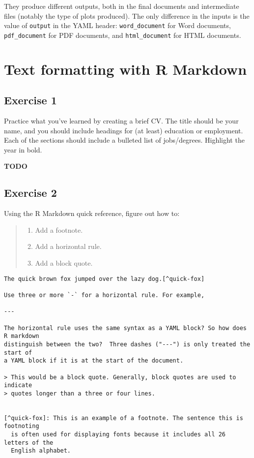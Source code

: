 \documentclass[]{book}
\providecommand{\tightlist}{%
  \setlength{\itemsep}{0pt}\setlength{\parskip}{0pt}}
\theoremstyle{definition}
\theoremstyle{definition}
\theoremstyle{definition}
\theoremstyle{remark}
\begin{document}
They produce different outputs, both in the final documents and
intermediate files (notably the type of plots produced). The only
difference in the inputs is the value of \texttt{output} in the YAML
header: \texttt{word\_document} for Word documents,
\texttt{pdf\_document} for PDF documents, and \texttt{html\_document}
for HTML documents.

\hypertarget{text-formatting-with-r-markdown}{%
\section{Text formatting with R
Markdown}\label{text-formatting-with-r-markdown}}

\hypertarget{exercise-1-66}{%
\subsection{Exercise 1}\label{exercise-1-66}}

Practice what you've learned by creating a brief CV. The title should be
your name, and you should include headings for (at least) education or
employment. Each of the sections should include a bulleted list of
jobs/degrees. Highlight the year in bold.

\textbf{TODO}

\hypertarget{exercise-2-65}{%
\subsection{Exercise 2}\label{exercise-2-65}}

Using the R Markdown quick reference, figure out how to:

\begin{quote}
\begin{enumerate}
\def\labelenumi{\arabic{enumi}.}
\tightlist
\item
  Add a footnote.
\item
  Add a horizontal rule.
\item
  Add a block quote.
\end{enumerate}
\end{quote}

\begin{verbatim}
The quick brown fox jumped over the lazy dog.[^quick-fox]

Use three or more `-` for a horizontal rule. For example,

---

The horizontal rule uses the same syntax as a YAML block? So how does R markdown
distinguish between the two?  Three dashes ("---") is only treated the start of 
a YAML block if it is at the start of the document.

> This would be a block quote. Generally, block quotes are used to indicate
> quotes longer than a three or four lines. 


[^quick-fox]: This is an example of a footnote. The sentence this is footnoting
  is often used for displaying fonts because it includes all 26 letters of the 
  English alphabet.
  
\end{verbatim}
\end{document}

